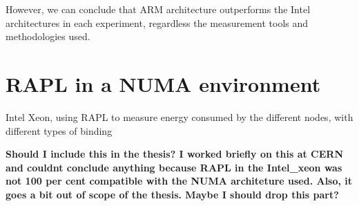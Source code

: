 However, we can conclude that ARM architecture outperforms the Intel architectures in each experiment, regardless the measurement tools and methodologies used.

\section{RAPL in a NUMA environment}
Intel Xeon, using RAPL to measure energy consumed by the different nodes, with different types of binding

\textbf{Should I include this in the thesis? I worked briefly on this at CERN and couldnt conclude anything because RAPL in the Intel\_xeon was not 100 per cent compatible with the NUMA architeture used. Also, it goes a bit out of scope of the thesis. Maybe I should drop this part?}